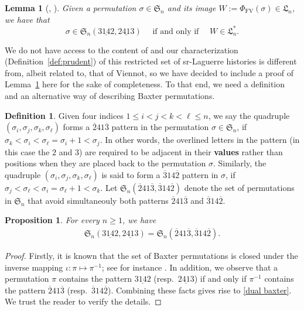 \documentclass[12pt,reqno]{amsart}
\numberwithin{equation}{section}
\theoremstyle{plain}
\newtheorem{lemma}[theorem]{Lemma}
\newtheorem{proposition}[theorem]{Proposition}
\theoremstyle{definition}
\newtheorem{Def}[theorem]{Definition}
\def\Sym{\mathfrak{S}}
\def\FV{\mathrm{FV}}
\def\baxter{\mathrm{3\underline{14}2,2\underline{41}3}}
\def\dualbax{\mathrm{\overline{2}41\overline{3},\overline{3}14\overline{2}}}
\def\LH{\mathfrak{L}}
\begin{document}
\begin{lemma}[\cite{Vi81}, {\cite[Chapter 4b, p.~111]{ABjC}}]\label{lem:Viennot}
Given a permutation $\sigma\in\Sym_n$ and its image $W:=\Phi_{\FV}(\sigma)\in\LH_n$, we have that
$$\sigma\in\Sym_n(\baxter)\quad \text{ if and only if }\quad  W\in\LH_n^*.$$
\end{lemma}

We do not have access to the content of \cite{Vi81} and our characterization (Definition~\ref{def:prudent}) of this restricted set of sr-Laguerre histories is different from, albeit related to, that of Viennot, so we have decided to include a proof of Lemma~\ref{lem:Viennot} here for the sake of completeness. To that end, we need a definition and an alternative way of describing Baxter permutations.
\begin{Def}
Given four indices $1\le i<j<k<\ell\le n$, we say the quadruple $(\sigma_i,\sigma_j,\sigma_k,\sigma_{\ell})$ forms a $\overline{2}41\overline{3}$ pattern in the permutation $\sigma\in\Sym_n$, if $\sigma_k<\sigma_i<\sigma_{\ell}=\sigma_i+1<\sigma_j$. In other words, the overlined letters in the pattern (in this case the $2$ and $3$) are required to be adjacent in their {\bf values} rather than positions when they are placed back to the permutation $\sigma$. Similarly, the quadruple $(\sigma_i,\sigma_j,\sigma_k,\sigma_{\ell})$ is said to form a $\overline{3}14\overline{2}$ pattern in $\sigma$, if $\sigma_j<\sigma_{\ell}<\sigma_i=\sigma_{\ell}+1<\sigma_k$. Let $\Sym_n(\dualbax)$ denote the set of permutations in $\Sym_n$ that avoid simultaneouly both patterns $\overline{2}41\overline{3}$ and $\overline{3}14\overline{2}$.
\end{Def}
\begin{proposition}
For every $n\ge 1$, we have
\begin{align}\label{dual baxter}
\Sym_{n}(\baxter) = \Sym_n(\dualbax).
\end{align}
\end{proposition}
\begin{proof}
Firstly, it is known that the set of Baxter permutations is closed under the inverse mapping $\iota:\pi\mapsto\pi^{-1}$; see for instance \cite[Lemma 2.1]{LL23}. In addition, we observe that a permutation $\pi$ contains the pattern $3\underline{14}2$ (resp.~$2\underline{41}3$) if and only if $\pi^{-1}$ contains the pattern $\overline{2}41\overline{3}$ (resp.~$\overline{3}14\overline{2}$). Combining these facts gives rise to \eqref{dual baxter}. We trust the reader to verify the details.
\end{proof}
\end{document}
